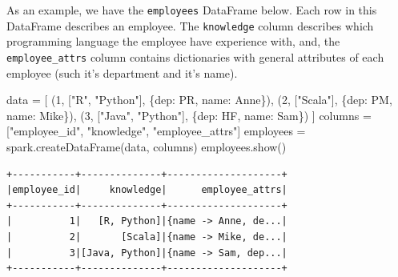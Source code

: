 \documentclass[
  11pt,
  letterpaper,
  DIV=11,
  numbers=noendperiod]{scrreprt}
\newenvironment{Shaded}{\begin{snugshade}}{\end{snugshade}}
\newcommand{\DecValTok}[1]{\textcolor[rgb]{0.68,0.00,0.00}{#1}}
\newcommand{\NormalTok}[1]{\textcolor[rgb]{0.00,0.23,0.31}{#1}}
\newcommand{\OperatorTok}[1]{\textcolor[rgb]{0.37,0.37,0.37}{#1}}
\newcommand{\StringTok}[1]{\textcolor[rgb]{0.13,0.47,0.30}{#1}}
\begin{document}
As an example, we have the \texttt{employees} DataFrame below. Each row
in this DataFrame describes an employee. The \texttt{knowledge} column
describes which programming language the employee have experience with,
and, the \texttt{employee\_attrs} column contains dictionaries with
general attributes of each employee (such it's department and it's
name).

\begin{Shaded}
\begin{Highlighting}[]
\NormalTok{data }\OperatorTok{=}\NormalTok{ [}
\NormalTok{    (}\DecValTok{1}\NormalTok{, [}\StringTok{"R"}\NormalTok{, }\StringTok{"Python"}\NormalTok{], \{}\StringTok{\textquotesingle{}dep\textquotesingle{}}\NormalTok{: }\StringTok{\textquotesingle{}PR\textquotesingle{}}\NormalTok{, }\StringTok{\textquotesingle{}name\textquotesingle{}}\NormalTok{: }\StringTok{\textquotesingle{}Anne\textquotesingle{}}\NormalTok{\}),}
\NormalTok{    (}\DecValTok{2}\NormalTok{, [}\StringTok{"Scala"}\NormalTok{], \{}\StringTok{\textquotesingle{}dep\textquotesingle{}}\NormalTok{: }\StringTok{\textquotesingle{}PM\textquotesingle{}}\NormalTok{, }\StringTok{\textquotesingle{}name\textquotesingle{}}\NormalTok{: }\StringTok{\textquotesingle{}Mike\textquotesingle{}}\NormalTok{\}),}
\NormalTok{    (}\DecValTok{3}\NormalTok{, [}\StringTok{"Java"}\NormalTok{, }\StringTok{"Python"}\NormalTok{], \{}\StringTok{\textquotesingle{}dep\textquotesingle{}}\NormalTok{: }\StringTok{\textquotesingle{}HF\textquotesingle{}}\NormalTok{, }\StringTok{\textquotesingle{}name\textquotesingle{}}\NormalTok{: }\StringTok{\textquotesingle{}Sam\textquotesingle{}}\NormalTok{\})}
\NormalTok{]}
\NormalTok{columns }\OperatorTok{=}\NormalTok{ [}\StringTok{"employee\_id"}\NormalTok{, }\StringTok{"knowledge"}\NormalTok{, }\StringTok{"employee\_attrs"}\NormalTok{]}
\NormalTok{employees }\OperatorTok{=}\NormalTok{ spark.createDataFrame(data, columns)}
\NormalTok{employees.show()}
\end{Highlighting}
\end{Shaded}

\begin{verbatim}
+-----------+--------------+--------------------+
|employee_id|     knowledge|      employee_attrs|
+-----------+--------------+--------------------+
|          1|   [R, Python]|{name -> Anne, de...|
|          2|       [Scala]|{name -> Mike, de...|
|          3|[Java, Python]|{name -> Sam, dep...|
+-----------+--------------+--------------------+
\end{verbatim}
\end{document}
